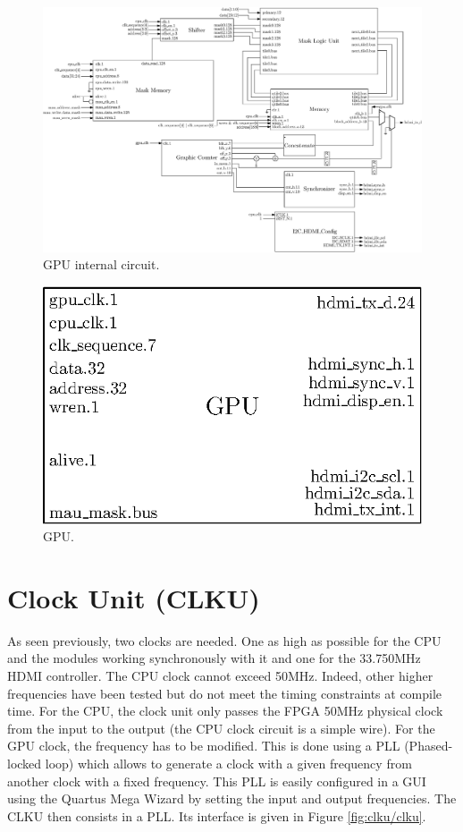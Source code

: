 \begin{figure}[H]
    \centering
    \includegraphics[width=\linewidth]{Chapter4-GPU_CLKU/res/gpu_in}
    \caption{GPU internal circuit.}
    \label{fig:gpu/gpu_in}
\end{figure}

\begin{figure}[H]
    \centering
    \includegraphics[scale=1.0]{Chapter4-GPU_CLKU/res/gpu}
    \caption{GPU.}
    \label{fig:gpu/gpu}
\end{figure}

\section{Clock Unit (CLKU)}

As seen previously, two clocks are needed. One as high as possible for the CPU and the modules 
working synchronously with it and one for the 33.750MHz HDMI controller. The CPU clock cannot 
exceed 50MHz. Indeed, other higher frequencies have been tested but do not meet the timing 
constraints at compile time. For the CPU, the clock unit only passes the FPGA 50MHz physical clock 
from the input to the output (the CPU clock circuit is a simple wire). For the GPU clock, the frequency
has to be modified. This is done 
using a PLL (Phased-locked loop) which allows to generate a clock with a given frequency from 
another clock with a fixed frequency. This PLL is easily configured in a GUI using the Quartus 
Mega Wizard by setting the input and output frequencies. The CLKU then consists in a PLL. Its interface 
is given in Figure \ref{fig:clku/clku}.

